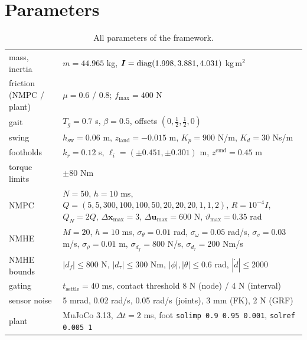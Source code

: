 \documentclass[11pt]{article}
\newcommand{\bx}{\bm{x}}\newcommand{\bu}{\bm{u}}\newcommand{\bw}{\bm{w}}\newcommand{\by}{\bm{y}}
\begin{document}
\section{Parameters}
\begin{table}[H]\centering\footnotesize\caption{All parameters of the framework.}
\begin{tabular}{@{}p{3.1cm}p{4.9cm}@{}}\toprule
mass, inertia & $m=44.965$ kg, $\bm{I}=\mathrm{diag}(1.998,3.881,4.031)$ kg\,m$^2$\\
friction (NMPC / plant) & $\mu=0.6$ / $0.8$; $f_{\max}=400$ N\\
gait & $T_g=0.7$ s, $\beta=0.5$, offsets $(0,\frac12,\frac12,0)$\\
swing & $h_{\mathrm{sw}}=0.06$ m, $z_{\mathrm{land}}=-0.015$ m, $K_p=900$ N/m, $K_d=30$ Ns/m\\
footholds & $k_r=0.12$ s, $\bm\ell_i=(\pm0.451,\pm0.301)$ m, $z^{\mathrm{cmd}}=0.45$ m\\
torque limits & $\pm80$ Nm\\
NMPC & $N=50$, $h=10$ ms, $Q=(5,5,300,100,100,50,20,20,20,1,1,2)$, $R=10^{-4}I$, $Q_N=2Q$, $\Delta\bx_{\max}=3$, $\Delta\bu_{\max}=600$ N, $\vartheta_{\max}=0.35$ rad\\
NMHE & $M=20$, $h=10$ ms, $\sigma_\theta=0.01$ rad, $\sigma_\omega=0.05$ rad/s, $\sigma_v=0.03$ m/s, $\sigma_\rho=0.01$ m, $\sigma_{\dot d_f}=800$ N/s, $\sigma_{\dot d_\tau}=200$ Nm/s\\
NMHE bounds & $|d_f|\le800$ N, $|d_\tau|\le300$ Nm, $|\phi|,|\theta|\le0.6$ rad, $|\dot d|\le2000$\\
gating & $t_{\mathrm{settle}}=40$ ms, contact threshold 8 N (node) / 4 N (interval)\\
sensor noise & 5 mrad, 0.02 rad/s, 0.05 rad/s (joints), 3 mm (FK), 2 N (GRF)\\
plant & MuJoCo 3.13, $\Delta t=2$ ms, foot \texttt{solimp 0.9 0.95 0.001}, \texttt{solref 0.005 1}\\
\bottomrule\end{tabular}\end{table}
\end{document}
